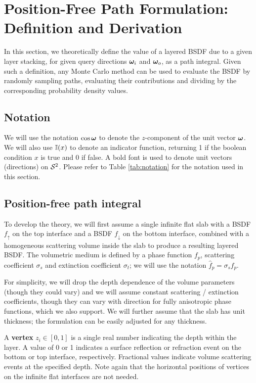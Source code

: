 \section{Position-Free Path Formulation: Definition and Derivation}
\label{sec:path-formulation}

In this section, we theoretically define the value of a layered BSDF due to a given layer stacking, for given query directions $\bm{\omega}_i$ and $\bm{\omega}_o$, as a path integral. Given such a definition, any Monte Carlo method can be used to evaluate the BSDF by randomly sampling paths, evaluating their contributions and dividing by the corresponding probability density values.

\subsection{Notation}

We will use the notation $\cos \bm{\omega}$ to denote the $z$-component of the unit vector $\bm{\omega}$. We will also use $\mathbb{I}(x)$ to denote an indicator function, returning 1 if the boolean condition $x$ is true and 0 if false. A bold font is used to denote unit vectors (directions) on ${\mathcal S^2}$. Please refer to Table \ref{tab:notation} for the notation used in this section.




\subsection{Position-free path integral}

To develop the theory, we will first assume a single infinite flat slab with a BSDF $f_\uparrow$ on the top interface and a BSDF $f_\downarrow$ on the bottom interface, combined with a homogeneous scattering volume inside the slab to produce a resulting layered BSDF. The volumetric medium is defined by a phase function $f_p$, scattering coefficient $\sigma_s$ and extinction coefficient $\sigma_t$; we will use the notation $\hat f_p = \sigma_s f_p$.

For simplicity, we will drop the depth dependence of the volume parameters (though they could vary) and we will assume constant scattering / extinction coefficients, though they can vary with direction for fully anisotropic phase functions, which we also support. We will further assume that the slab has unit thickness; the formulation can be easily adjusted for any thickness.

A {\bf vertex} $z_i \in [0, 1]$ is a single real number indicating the depth within the layer. A value of 0 or 1 indicates a surface reflection or refraction event on the bottom or top interface, respectively. Fractional values indicate volume scattering events at the specified depth. Note again that the horizontal positions of vertices on the infinite flat interfaces are not needed.

